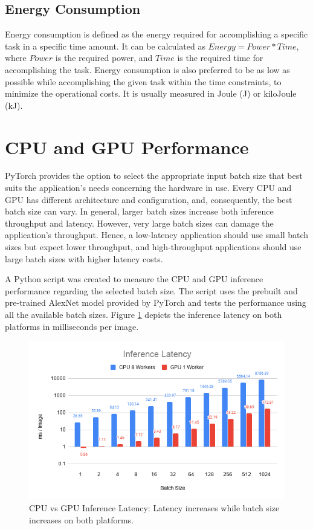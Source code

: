 \subsection{Energy Consumption}
Energy consumption is defined as the energy required for accomplishing a specific task in a specific time amount. It can be calculated as $Energy = Power * Time$, where $Power$ is the required power, and $Time$ is the required time for accomplishing the task. Energy consumption is also preferred to be as low as possible while accomplishing the given task within the time constraints, to minimize the operational costs. It is usually measured in Joule (J) or kiloJoule (kJ).

\section{CPU and GPU Performance}
PyTorch provides the option to select the appropriate input batch size that best suits the application's needs concerning the hardware in use. Every CPU and GPU has different architecture and configuration, and, consequently, the best batch size can vary. In general, larger batch sizes increase both inference throughput and latency. However, very large batch sizes can damage the application's throughput. Hence, a low-latency application should use small batch sizes but expect lower throughput, and high-throughput applications should use large batch sizes with higher latency costs.

A Python script was created to measure the CPU and GPU inference performance regarding the selected batch size. The script uses the prebuilt and pre-trained AlexNet model provided by PyTorch and tests the performance using all the available batch sizes. Figure \ref{fig:CPU-vs-GPU-Inference-Latency} depicts the inference latency on both platforms in milliseconds per image.

\begin{figure} [H]
	\centering
	\includegraphics[width=\textwidth]{Images/Results/CPU-GPU-Inference-Latency.png}
	\decoRule
	\caption[CPU vs GPU Inference Latency]{CPU vs GPU Inference Latency: Latency increases while batch size increases on both platforms.}
	\label{fig:CPU-vs-GPU-Inference-Latency}
\end{figure}

